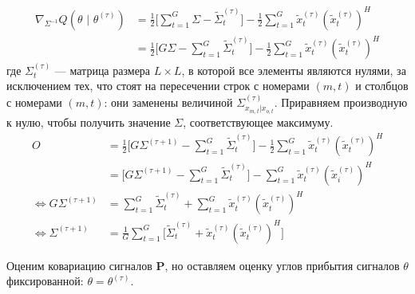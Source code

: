 \documentclass[11pt]{article}
\begin{document}
\begin{align*}
\nabla_{\Sigma^{-1}} Q(\theta \text{ | } \theta^{(\tau)}) &= \frac{1}{2} \big[ \sum_{t = 1}^{G} \Sigma -  \widetilde{\Sigma}_{t}^{(\tau)} \big] - \frac{1}{2} \sum_{t = 1}^{G} \widetilde{x}_t^{(\tau)}(\widetilde{x}_t^{(\tau)})^H \\
&= \frac{1}{2} \big[ G \Sigma - \sum_{t = 1}^{G} \widetilde{\Sigma}_{t}^{(\tau)} \big] - \frac{1}{2} \sum_{t = 1}^{G} \widetilde{x}_t^{(\tau)}(\widetilde{x}_t^{(\tau)})^H
\end{align*}
где $\Sigma_{t}^{(\tau)}$ --- матрица размера $L \times L$, в которой все элементы являются нулями, за исключением тех, что стоят на пересечении строк с номерами $(m,t)$ и столбцов с номерами $(m,t)$: они заменены величиной $\Sigma^{(\tau)}_{x_{m,t}|x_{o,t}}$.
Приравняем производную к нулю, чтобы получить значение $\Sigma$, соответствующее максимуму.
\begin{align*}
O &= \frac{1}{2} \big[ G \Sigma^{(\tau + 1)} - \sum_{t = 1}^{G} \widetilde{\Sigma}_{t}^{(\tau)} \big] - \frac{1}{2} \sum_{t = 1}^{G} \widetilde{x}_t^{(\tau)}(\widetilde{x}_t^{(\tau)})^H \\
&= \big[ G \Sigma^{(\tau + 1)} - \sum_{t = 1}^{G} \widetilde{\Sigma}_{t}^{(\tau)} \big] - \sum_{t = 1}^{G} \widetilde{x}_t^{(\tau)}(\widetilde{x}_i^{(\tau)})^H \\
\iff G \Sigma^{(\tau + 1)} &= \sum_{t = 1}^{G} \widetilde{\Sigma}_{t}^{(\tau)} + \sum_{t = 1}^{G} \widetilde{x}_t^{(\tau)}(\widetilde{x}_t^{(\tau)})^H \\
\iff \Sigma^{(\tau + 1)} &= \frac{1}{G} \sum_{t = 1}^{G} \Big[ \widetilde{\Sigma}_{t}^{(\tau)} + \widetilde{x}_t^{(\tau)}(\widetilde{x}_t^{(\tau)})^H \Big]
\end{align*}
\begin{center}
\fontsize{14}{18}\selectfont {}
\end{center}
Оценим ковариацию сигналов $\mathbf{P}$, но оставляем оценку углов прибытия сигналов $\theta$ фиксированной: $\theta = \theta^{(\tau)}$.
\begin{center}
\fontsize{16}{20}\selectfont {}
\end{center}
\begin{center}
\fontsize{14}{18}\selectfont {}
\end{center}
\begin{center}
\fontsize{14}{18}\selectfont {}
\end{center}
\begin{center}
\fontsize{14}{18}\selectfont {}
\end{center}
\begin{center}
\fontsize{14}{18}\selectfont {}
\end{center}
\begin{center}
\fontsize{16}{20}\selectfont {}
\end{center}
\end{document}
